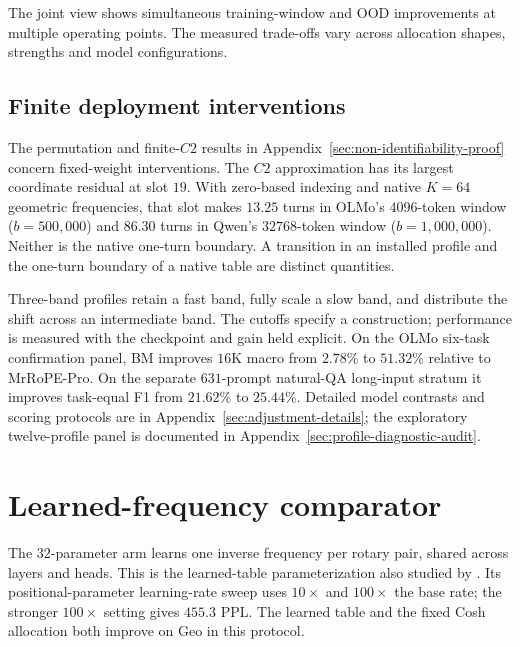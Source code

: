The joint view shows simultaneous training-window and OOD improvements at multiple operating points. The measured trade-offs vary across allocation shapes, strengths and model configurations.

\FloatBarrier
\subsection{Finite deployment interventions}
\label{sec:four-facts-mechanisms}
\label{sec:binary-elimination}
\label{sec:mrrope-pro-satisficing}

The permutation and finite-$C2$ results in Appendix~\ref{sec:non-identifiability-proof} concern fixed-weight interventions. The $C2$ approximation has its largest coordinate residual at slot $19$. With zero-based indexing and native $K=64$ geometric frequencies, that slot makes $13.25$ turns in OLMo's $4096$-token window ($b=500{,}000$) and $86.30$ turns in Qwen's $32768$-token window ($b=1{,}000{,}000$). Neither is the native one-turn boundary. A transition in an installed profile and the one-turn boundary of a native table are distinct quantities.

Three-band profiles retain a fast band, fully scale a slow band, and distribute the shift across an intermediate band. The cutoffs specify a construction; performance is measured with the checkpoint and gain held explicit. On the OLMo six-task confirmation panel, BM improves $16$K macro from $2.78\%$ to $51.32\%$ relative to MrRoPE-Pro. On the separate $631$-prompt natural-QA long-input stratum it improves task-equal F1 from $21.62\%$ to $25.44\%$. Detailed model contrasts and scoring protocols are in Appendix~\ref{sec:adjustment-details}; the exploratory twelve-profile panel is documented in Appendix~\ref{sec:profile-diagnostic-audit}.

\FloatBarrier
\section{Learned-frequency comparator}
\label{sec:pe-dominant}



The $32$-parameter arm learns one inverse frequency per rotary pair, shared
across layers and heads. This is the learned-table parameterization also
studied by \citet{karypis2026lerope}. Its positional-parameter learning-rate
sweep uses $10\times$ and $100\times$ the base rate; the stronger $100\times$
setting gives $455.3$ PPL. The learned table and the fixed Cosh allocation
both improve on Geo in this protocol.

